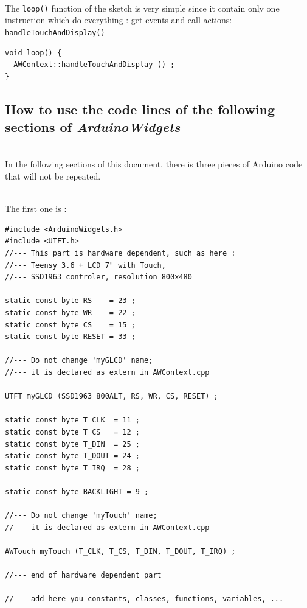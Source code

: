 \documentclass[a4paper,11pt]{extarticle}
\begin{document}
~\\The \texttt{loop()} function of the sketch is very simple since it contain only one instruction which do everything : get events and call actions: \texttt{handleTouchAndDisplay()} \\
 
\begin{lstlisting}[language=Arduinonl]
void loop() {
  AWContext::handleTouchAndDisplay () ;
}  
\end{lstlisting}
  
\newpage
\subsection{How to use the code lines of the following sections of \emph{ArduinoWidgets}}

~\\In the following sections of this document, there is three pieces of Arduino code that will not be repeated.

~\\The first one is :
\begin{lstlisting}[language=Arduinonl]
#include <ArduinoWidgets.h>
#include <UTFT.h>
//--- This part is hardware dependent, such as here :
//--- Teensy 3.6 + LCD 7" with Touch, 
//--- SSD1963 controler, resolution 800x480

static const byte RS    = 23 ;
static const byte WR    = 22 ;
static const byte CS    = 15 ;
static const byte RESET = 33 ;

//--- Do not change 'myGLCD' name; 
//--- it is declared as extern in AWContext.cpp

UTFT myGLCD (SSD1963_800ALT, RS, WR, CS, RESET) ;

static const byte T_CLK  = 11 ;
static const byte T_CS   = 12 ;
static const byte T_DIN  = 25 ;
static const byte T_DOUT = 24 ;
static const byte T_IRQ  = 28 ;

static const byte BACKLIGHT = 9 ;

//--- Do not change 'myTouch' name; 
//--- it is declared as extern in AWContext.cpp

AWTouch myTouch (T_CLK, T_CS, T_DIN, T_DOUT, T_IRQ) ;

//--- end of hardware dependent part 

//--- add here you constants, classes, functions, variables, ...
\end{lstlisting}
\end{document}
